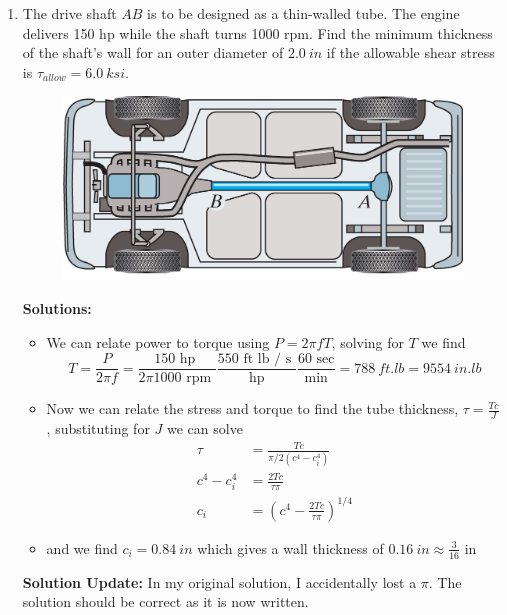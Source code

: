 \documentclass[12pt, oneside]{article}
\let\US\SI
\begin{document}
\begin{enumerate}
	\item %
		The drive shaft $AB$ is to be designed as a thin-walled tube.
		The engine delivers 150 hp while the shaft turns 1000 rpm.
		Find the minimum thickness of the shaft's wall for an outer diameter of $\US{2.0}{in}$ if the allowable shear stress is $\tau_{allow}=\US{6.0}{ksi}$.
		\begin{figure}[H]
			\centering
			\includegraphics[width=0.6\linewidth]{5-28}
		\end{figure}
		\textbf{Solutions:}
		\begin{itemize}
			\item We can relate power to torque using $P = 2\pi f T$, solving for $T$ we find
				\begin{equation*}
					T = \frac{P}{2\pi f} = \frac{ 150 \text{ hp } }{ 2 \pi 1000 \text{ rpm } } \frac{ 550 \text{ ft lb / s } }{ \text { hp } } \frac{ 60 \text{ sec} }{ \text{ min } } = \US{788}{ft.lb} = \US{9554}{in.lb}
				\end{equation*}
			\item Now we can relate the stress and torque to find the tube thickness, $\tau = \frac{Tc}{J}$, substituting for $J$ we can solve
				\begin{align*}
					\tau &= \frac{Tc}{\pi/2 (c^4 - c_i^4)}\\
					c^4 - c_i^4 &= \frac{2 T c}{\tau \pi}\\
					c_i &= \left( c^4 - \frac{2 T c}{\tau \pi} \right)^{1/4}
				\end{align*}
      \item and we find $c_i = \US{0.84}{in}$ which gives a wall thickness of $\US{0.16}{in} \approx \frac{3}{16}\text{ in}$
		\end{itemize}
		\textbf{Solution Update:} In my original solution, I accidentally lost a $\pi$. The solution should be correct as it is now written.


\end{enumerate}
\end{document}
